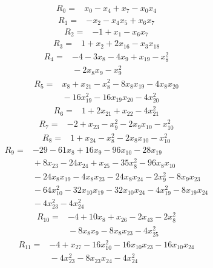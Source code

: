 \begingroup\small
\setlength{\jot}{2pt}
\begin{align*}
R_{0} ={}& x_{0} - x_{4} + x_{7} - x_{0} x_{4}
\end{align*}
\begin{align*}
R_{1} ={}& -x_{2} - x_{4} x_{5} + x_{6} x_{7}
\end{align*}
\begin{align*}
R_{2} ={}& -1 + x_{1} - x_{6} x_{7}
\end{align*}
\begin{align*}
R_{3} ={}& 1 + x_{2} + 2x_{16} - x_{3} x_{18}
\end{align*}
\begin{align*}
R_{4} ={}& -4 - 3x_{8} - 4x_{9} + x_{19} - x_{8}^{2} \\
&{} -2x_{8} x_{9} - x_{9}^{2}
\end{align*}
\begin{align*}
R_{5} ={}& x_{8} + x_{21} - x_{8}^{2} - 8x_{8} x_{19} - 4x_{8} x_{20} \\
&{} -16x_{19}^{2} - 16x_{19} x_{20} - 4x_{20}^{2}
\end{align*}
\begin{align*}
R_{6} ={}& 1 + 2x_{21} + x_{22} - 4x_{21}^{2}
\end{align*}
\begin{align*}
R_{7} ={}& -2 + x_{23} - x_{9}^{2} - 2x_{9} x_{10} - x_{10}^{2}
\end{align*}
\begin{align*}
R_{8} ={}& 1 + x_{24} - x_{8}^{2} - 2x_{8} x_{10} - x_{10}^{2}
\end{align*}
\begin{align*}
R_{9} ={}& -29 - 61x_{8} + 16x_{9} - 96x_{10} - 28x_{19} \\
&{} + 8x_{23} - 24x_{24} + x_{25} - 35x_{8}^{2} - 96x_{8} x_{10} \\
&{} -24x_{8} x_{19} - 4x_{8} x_{23} - 24x_{8} x_{24} - 2x_{9}^{2} - 8x_{9} x_{23} \\
&{} -64x_{10}^{2} - 32x_{10} x_{19} - 32x_{10} x_{24} - 4x_{19}^{2} - 8x_{19} x_{24} \\
&{} -4x_{23}^{2} - 4x_{24}^{2}
\end{align*}
\begin{align*}
R_{10} ={}& -4 + 10x_{8} + x_{26} - 2x_{43} - 2x_{8}^{2} \\
&{} -8x_{8} x_{9} - 8x_{8} x_{23} - 4x_{25}^{2}
\end{align*}
\begin{align*}
R_{11} ={}& -4 + x_{27} - 16x_{10}^{2} - 16x_{10} x_{23} - 16x_{10} x_{24} \\
&{} -4x_{23}^{2} - 8x_{23} x_{24} - 4x_{24}^{2}
\end{align*}
